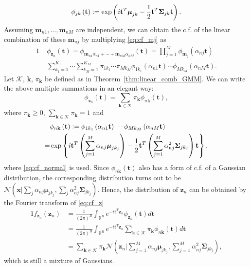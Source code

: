 \documentclass[twocolumn,english]{IEEEtran}
\theoremstyle{plain}
\begin{document}
\begin{equation}
\phi_{jk}\left(\mathbf{t}\right)\vcentcolon=\exp\left(i\mathbf{t}^{T}\boldsymbol{\mu}_{jk}-\frac{1}{2}\mathbf{t}^{T}\boldsymbol{\Sigma}_{jk}\mathbf{t}\right).\label{eq:cf_normal}
\end{equation}
Assuming $\mathbf{m}_{n1},\dots,\mathbf{m}_{nM}$ are independent,
we can obtain the c.f. of the linear combination of these $\mathbf{m}_{nj}$
by multiplying \eqref{eq:cf_mj} as 
\begin{alignat*}{1}
 & \phi_{\mathbf{z}_{n}}\left(\mathbf{t}\right)=\phi_{\mathbf{m}_{n1}\alpha_{n1}+\cdots+\mathbf{m}_{nM}\alpha_{nM}}\left(\mathbf{t}\right)=\prod_{j=1}^{M}\phi_{\mathbf{m}_{j}}\left(\alpha_{nj}\mathbf{t}\right)\\
= & \sum_{k_{1}=1}^{K_{1}}\cdots\sum_{k_{M}=1}^{K_{M}}\pi_{1k_{1}}\cdots\pi_{Mk_{M}}\phi_{1k_{1}}\left(\alpha_{n1}\mathbf{t}\right)\cdots\phi_{Mk_{M}}\left(\alpha_{nM}\mathbf{t}\right).
\end{alignat*}
Let $\mathcal{K}$, $\mathbf{k}$, $\pi_{\mathbf{k}}$ be defined
as in Theorem~\ref{thm:linear_comb_GMM}. We can write the above
multiple summations in an elegant way:
\begin{equation}
\phi_{\mathbf{z}_{n}}\left(\mathbf{t}\right)=\sum_{\mathbf{k}\in\mathcal{K}}\pi_{\mathbf{k}}\phi_{n\mathbf{k}}\left(\mathbf{t}\right),\label{eq:cf_z}
\end{equation}
where $\pi_{\mathbf{k}}\ge0$, $\sum_{\mathbf{k}\in\mathcal{K}}\pi_{\mathbf{k}}=1$
and 
\begin{alignat*}{1}
 & \phi_{n\mathbf{k}}\left(\mathbf{t}\right)\vcentcolon=\phi_{1k_{1}}\left(\alpha_{n1}\mathbf{t}\right)\cdots\phi_{Mk_{M}}\left(\alpha_{nM}\mathbf{t}\right)\\
= & \exp\left\{ i\mathbf{t}^{T}\left(\sum_{j=1}^{M}\alpha_{nj}\boldsymbol{\mu}_{jk_{j}}\right)-\frac{1}{2}\mathbf{t}^{T}\left(\sum_{j=1}^{M}\alpha_{nj}^{2}\boldsymbol{\Sigma}_{jk_{j}}\right)\mathbf{t}\right\} ,
\end{alignat*}
where \eqref{eq:cf_normal} is used. Since $\phi_{n\mathbf{k}}\left(\mathbf{t}\right)$
also has a form of c.f. of a Gaussian distribution, the corresponding
distribution turns out to be $\mathcal{N}\left(\mathbf{x}\vert\sum_{j}\alpha_{nj}\boldsymbol{\mu}_{jk_{j}},\sum_{j}\alpha_{nj}^{2}\boldsymbol{\Sigma}_{jk_{j}}\right)$.
Hence, the distribution of $\mathbf{z}_{n}$ can be obtained by the
Fourier transform of \eqref{eq:cf_z}
\begin{alignat}{1}
f_{\mathbf{z}_{n}}\left(\mathbf{z}_{n}\right) & =\frac{1}{\left(2\pi\right)^{B}}\int_{\mathbb{R}^{B}}e^{-i\mathbf{t}^{T}\mathbf{z}_{n}}\phi_{\mathbf{z}_{n}}\left(\mathbf{t}\right)d\mathbf{t}\nonumber \\
 & =\frac{1}{\left(2\pi\right)^{B}}\int_{\mathbb{R}^{B}}e^{-i\mathbf{t}^{T}\mathbf{z}_{n}}\sum_{\mathbf{k}\in\mathcal{K}}\pi_{\mathbf{k}}\phi_{n\mathbf{k}}\left(\mathbf{t}\right)d\mathbf{t}\nonumber \\
 & =\sum_{\mathbf{k}\in\mathcal{K}}\pi_{\mathbf{k}}\mathcal{N}\left(\mathbf{z}_{n}\vert\sum_{j=1}^{M}\alpha_{nj}\boldsymbol{\mu}_{jk_{j}},\sum_{j=1}^{M}\alpha_{nj}^{2}\boldsymbol{\Sigma}_{jk_{j}}\right),\label{eq:density_z}
\end{alignat}
which is still a mixture of Gaussians.
\end{document}
